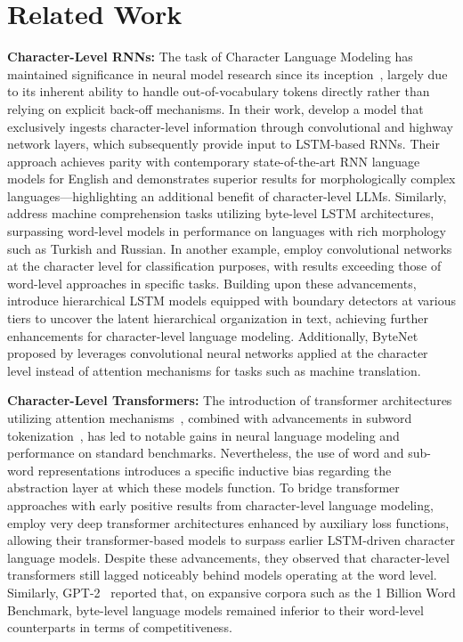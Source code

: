 \section{Related Work}
\label{section:related_work}

\textbf{Character-Level RNNs:} The task of Character Language Modeling has maintained significance in neural model research since its inception~\citep{sutskever2011generating,mikolov2012subword,graves2013generating}, largely due to its inherent ability to handle out-of-vocabulary tokens directly rather than relying on explicit back-off mechanisms. In their work, \cite{kim2016character} develop a model that exclusively ingests character-level information through convolutional and highway network layers, which subsequently provide input to LSTM-based RNNs. Their approach achieves parity with contemporary state-of-the-art RNN language models for English and demonstrates superior results for morphologically complex languages—highlighting an additional benefit of character-level LLMs. Similarly, \cite{kenter2018byte} address machine comprehension tasks utilizing byte-level LSTM architectures, surpassing word-level models in performance on languages with rich morphology such as Turkish and Russian. In another example, \cite{zhang2015character} employ convolutional networks at the character level for classification purposes, with results exceeding those of word-level approaches in specific tasks. Building upon these advancements, \citet{chung2019hierarchical} introduce hierarchical LSTM models equipped with boundary detectors at various tiers to uncover the latent hierarchical organization in text, achieving further enhancements for character-level language modeling. Additionally, ByteNet proposed by \cite{kalchbrenner2016neural} leverages convolutional neural networks applied at the character level instead of attention mechanisms for tasks such as machine translation.

\textbf{Character-Level Transformers:} The introduction of transformer architectures utilizing attention mechanisms~\citep{vaswani2017attention}, combined with advancements in subword tokenization~\citep{sennrich-etal-2016-neural}, has led to notable gains in neural language modeling and performance on standard benchmarks. Nevertheless, the use of word and sub-word representations introduces a specific inductive bias regarding the abstraction layer at which these models function. To bridge transformer approaches with early positive results from character-level language modeling, \citet{al2019character} employ very deep transformer architectures enhanced by auxiliary loss functions, allowing their transformer-based models to surpass earlier LSTM-driven character language models. Despite these advancements, they observed that character-level transformers still lagged noticeably behind models operating at the word level. Similarly, GPT-2~\citep{radfordgpt2} reported that, on expansive corpora such as the 1 Billion Word Benchmark, byte-level language models remained inferior to their word-level counterparts in terms of competitiveness.

